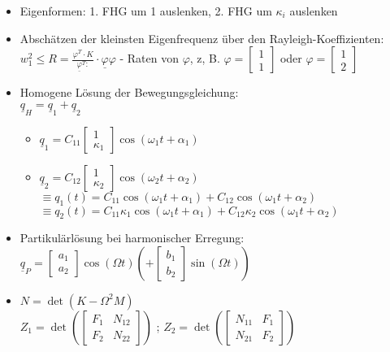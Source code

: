 \documentclass[fleqn,twoside]{article}
\begin{document}
\begin{multicols*}{3}
\begin{itemize}
\item  Eigenformen: 1. FHG um 1 auslenken, 2. FHG um $\kappa_i$ auslenken
\item  Abschätzen der kleinsten Eigenfrequenz über den Rayleigh-Koeffizienten: $w_1^2 \leq R=\frac{\varphi^T \cdot K}{\underline{\varphi}^T:} \cdot \underline{\varphi} \varphi$ - Raten von $\varphi$, z, B. $\varphi=\left[\begin{array}{l}1 \\ 1\end{array}\right]$ oder $\varphi=\left[\begin{array}{l}1 \\ 2\end{array}\right]$
\item  Homogene Lösung der Bewegungsgleichung: \\$\underline{q}_H=\underline{q}_1+\underline{q}_2$
    \begin{itemize}
    \item $ \underline{q}_1=C_{11}\left[\begin{array}{c}
    1 \\
    \kappa_1
    \end{array}\right] \cos \left(\omega_1 t+\alpha_1\right) $
    \item $ \underline{q}_2=C_{12}\left[\begin{array}{c}
    1 \\
    \kappa_2
    \end{array}\right] \cos \left(\omega_2 t+\alpha_2\right) $\\
    \footnotesize
        $\equiv q_1(t)=C_{11} \cos \left(\omega_1 t+\alpha_1\right)+C_{12} \cos \left(\omega_1 t+\alpha_2\right) $\\
        $\equiv q_2(t)=C_{11} \kappa_1 \cos \left(\omega_1 t+\alpha_1\right)+C_{12} \kappa_2 \cos \left(\omega_1 t+\alpha_2\right) $
    \footnotesize
    \end{itemize}
\item Partikulärlösung bei harmonischer Erregung: \\ $\underline{q}_P=\left[\begin{array}{l}a_1 \\ a_2\end{array}\right] \cos (\Omega t)\left(+\left[\begin{array}{l}b_1 \\ b_2\end{array}\right] \sin (\Omega t)\right)$
\item $N=\det(K-\Omega^2 M)$ \\ $Z_1=\det \left( \begin{bmatrix} F_1 & N_{12}\\ F_2 & N_{22}\end{bmatrix} \right)$ ; $Z_2=\det \left( \begin{bmatrix} N_{11} & F_1\\  N_{21} & F_2 \end{bmatrix} \right)$

\end{itemize}
\end{multicols*}
\end{document}
